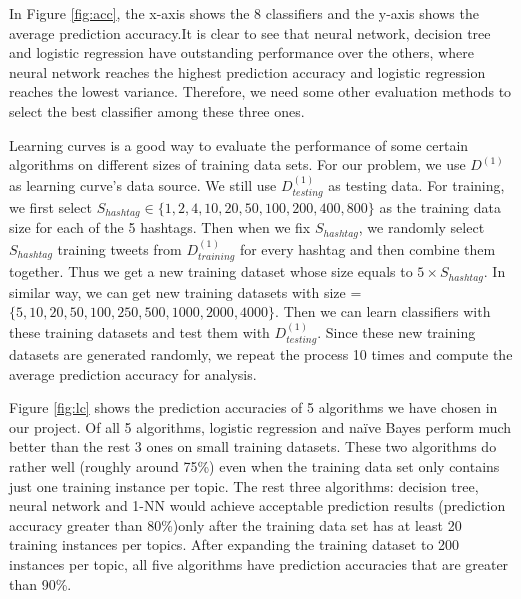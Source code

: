 \documentclass[letterpaper,11pt,twocolumn]{article}
\begin{document}
\begin{figure*}[!htb]
\centering
{}
\caption{Average Prediction Accuracies of 8 Algorithms}
\label{fig:acc}
\end{figure*}

In Figure \ref{fig:acc}, the x-axis shows the 8 classifiers and the y-axis shows the average prediction accuracy.It is clear to see that neural network, decision tree and logistic regression have outstanding performance over the others, where neural network reaches the highest prediction accuracy and logistic regression reaches the lowest variance. Therefore, we need some other evaluation methods to select the best classifier among these three ones.

Learning curves is a good way to evaluate the performance of some certain algorithms on different sizes of training data sets. For our problem, we use $D^{(1)}$ as learning curve's data source. We still use $D_{testing}^{(1)}$ as testing data. For training, we first select $S_{hashtag} \in \{1, 2, 4, 10, 20, 50, 100, 200, 400, 800\}$ as the training data size for each of the 5 hashtags. Then when we fix $S_{hashtag}$, we randomly select $S_{hashtag}$ training tweets from $D_{training}^{(1)}$ for every hashtag and then combine them together. Thus we get a new training dataset whose size equals to $5 \times S_{hashtag}$. In similar way, we can get new training datasets with size = $\{5, 10, 20, 50, 100, 250, 500, 1000, 2000, 4000\}$. Then we can learn classifiers with these training datasets and test them with $D_{testing}^{(1)}$. Since these new training datasets are generated randomly, we repeat the process 10 times and compute the average prediction accuracy for analysis.

\begin{figure*}[!htb]
\centering
{}
\caption{Learning Curve for 5 Different Algorithms}
\label{fig:lc}
\end{figure*}

Figure \ref{fig:lc} shows the prediction accuracies of 5 algorithms we have chosen in our project. Of all 5 algorithms, logistic regression and na{\"i}ve Bayes perform much better than the rest 3 ones on small training datasets. These two algorithms do rather well (roughly around 75\%) even when the training data set only contains just one training instance per topic. The rest three algorithms: decision tree, neural network and 1-NN would achieve acceptable prediction results (prediction accuracy greater than 80\%)only after the training data set has at least 20 training instances per topics. After expanding the training dataset to 200 instances per topic, all five algorithms have prediction accuracies that are greater than 90\%. 
\end{document}

